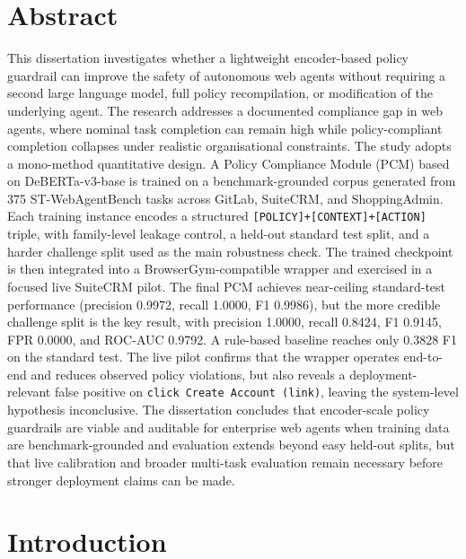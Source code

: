 \documentclass[12pt,a4paper]{article}
\begin{document}
\section*{Abstract}
This dissertation investigates whether a lightweight encoder-based policy
guardrail can improve the safety of autonomous web agents without requiring a
second large language model, full policy recompilation, or modification of the
underlying agent. The research addresses a documented compliance gap in web
agents, where nominal task completion can remain high while policy-compliant
completion collapses under realistic organisational constraints. The study
adopts a mono-method quantitative design. A Policy Compliance Module (PCM)
based on DeBERTa-v3-base is trained on a benchmark-grounded corpus generated
from 375 ST-WebAgentBench tasks across GitLab, SuiteCRM, and ShoppingAdmin.
Each training instance encodes a structured
\texttt{[POLICY]+[CONTEXT]+[ACTION]} triple, with family-level leakage control,
a held-out standard test split, and a harder challenge split used as the main
robustness check. The trained checkpoint is then integrated into a
BrowserGym-compatible wrapper and exercised in a focused live SuiteCRM pilot.
The final PCM achieves near-ceiling standard-test performance
(precision 0.9972, recall 1.0000, F1 0.9986), but the more credible challenge
split is the key result, with precision 1.0000, recall 0.8424, F1 0.9145,
FPR 0.0000, and ROC-AUC 0.9792. A rule-based baseline reaches only 0.3828 F1
on the standard test. The live pilot confirms that the wrapper operates
end-to-end and reduces observed policy violations, but also reveals a
deployment-relevant false positive on \texttt{click Create Account (link)},
leaving the system-level hypothesis inconclusive. The dissertation concludes
that encoder-scale policy guardrails are viable and auditable for enterprise web
agents when training data are benchmark-grounded and evaluation extends beyond
easy held-out splits, but that live calibration and broader multi-task
evaluation remain necessary before stronger deployment claims can be made.
\clearpage

\hypersetup{pageanchor=true}
\setcounter{page}{1}

\setcounter{section}{0}
\section{Introduction}
\label{ch:intro}
\end{document}
